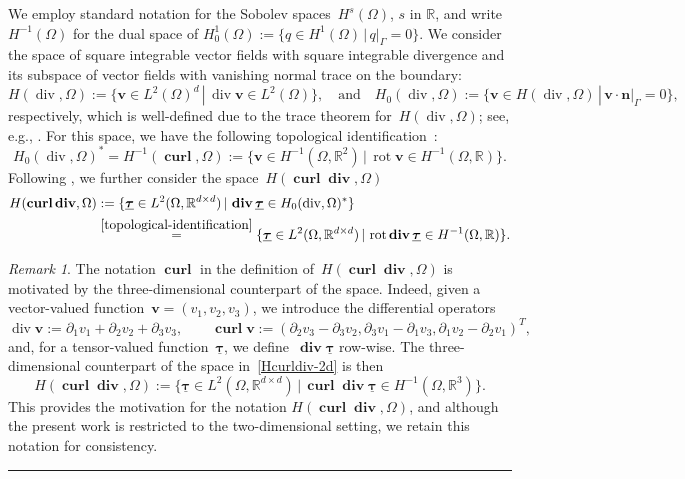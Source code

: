 \documentclass[a4paper,twoside,10pt]{article}
\theoremstyle{plain}
\theoremstyle{remark}
\newtheorem{remark}[theorem]{Remark}
\theoremstyle{definition}
\numberwithin{equation}{section}
\numberwithin{figure}{section}
\newcommand{\eremk}{\hbox{}\hfill\rule{0.8ex}{0.8ex}}
\newcommand{\Rbb}{\mathbb{R}}
\newcommand{\Rbbdd}{\mathbb{R}^{d\times d}}
\newcommand{\taubf}{\underline{\boldsymbol{\tau}}}
\newcommand{\vbf}{\mathbf{v}}
\DeclareMathOperator{\dive}{div}
\DeclareMathOperator{\divebf}{\mathbf{div}}
\DeclareMathOperator{\rot}{rot}
\DeclareMathOperator{\curlbf}{\mathbf{curl}}
\newcommand{\nbf}{\mathbf{n}}
\newcommand{\Ltwo}{L^2}
\newcommand{\LtwoOmega}{\Ltwo(\Omega)}
\newcommand{\LtwoOmegad}{\Ltwo(\Omega)^d}
\newcommand{\Hcurldivbf}{H(\curlbf\divebf,\Omega)}
\newcommand{\Hdiv}{H(\dive,\Omega)}
\newcommand{\Hzerodiv}{H_0(\dive,\Omega)}
\begin{document}
We employ standard notation for the Sobolev spaces~$H^s(\Omega)$, $s$ in $\Rbb$,
and write~$H^{-1}(\Omega)$ for the dual space of
$H^1_0(\Omega):= \{q \in H^1(\Omega) \, | \, q|_{\Gamma} = 0\}$.
We consider the space of square integrable vector fields with square integrable divergence
and its subspace of vector fields with vanishing normal trace on the boundary:
\begin{equation*}
\Hdiv := \{ \vbf \in \LtwoOmegad \, | \, \dive\vbf \in \LtwoOmega \},
\quad 
\text{and}
\quad
\Hzerodiv := \{ \vbf \in \Hdiv \, | \, \vbf \cdot \nbf|_{\Gamma} = 0 \},
\end{equation*}
respectively, which is well-defined due to the trace theorem for~$\Hdiv$;
see, e.g., \cite{Boffi-Brezzi-Fortin:2013}.
For this space,
we have the following topological identification~\cite[Thm.~2.1]{Gopalakrishnan-Lederer-Schoberl:2020}:
\begin{equation} \label{topological-identification}
\Hzerodiv^* =
H^{-1}(\curlbf,\Omega)
:= \{ \vbf \in H^{-1}(\Omega,\Rbb^2) \, | \, \rot \vbf \in H^{-1}(\Omega,\Rbb) \}.
\end{equation}
Following \cite{Gopalakrishnan-Lederer-Schoberl:2020},
we further consider the space~$\Hcurldivbf$
\begin{equation} \label{Hcurldiv-2d}
\begin{split}
\Hcurldivbf
&:=
\{ \taubf \in \Ltwo(\Omega,\Rbbdd) \, | \, \divebf\taubf \in  H_0(\dive,\Omega)^*\} \\
&\overset{\eqref{topological-identification}}{=}
\{ \taubf \in \Ltwo(\Omega,\Rbbdd) \, | \, \rot \divebf\taubf \in  H^{-1}(\Omega,\Rbb)\}.
\end{split}
\end{equation}


\begin{remark}
The notation $\curlbf$ in the definition of~$\Hcurldivbf$
is motivated by the three-dimensional counterpart of the space.
Indeed,
given a vector-valued function~$\vbf = (v_1, v_2, v_3)$,
we introduce the differential operators
\begin{equation*}
\dive \vbf :=\partial_1 v_1 + \partial_2 v_2 + \partial_3 v_3, \qquad
\curlbf \vbf := (\partial_2 v_3 - \partial_3 v_2, \partial_3 v_1 - \partial_1 v_3, \partial_1 v_2 - \partial_2 v_1)^T,
\end{equation*}
and, for a tensor-valued function~$\taubf$,
we define~$\divebf \taubf$ row-wise.
The three-dimensional counterpart of the space in~\eqref{Hcurldiv-2d} is then
\begin{equation*}
\Hcurldivbf := \{ \taubf \in \Ltwo(\Omega,\Rbbdd) \, | \, \curlbf \divebf\taubf \in  H^{-1}(\Omega,\Rbb^3)\}.
\end{equation*}
This provides the motivation for the notation $\Hcurldivbf$,
and although the present work is restricted to the two-dimensional setting,
we retain this notation for consistency.
\eremk
\end{remark}
\end{document}
